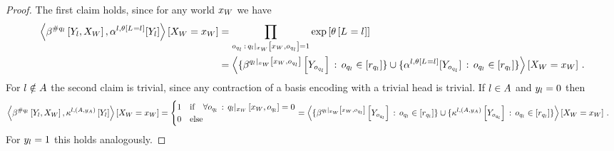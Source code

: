\begin{proof}
    The first claim holds, since for any world $x_{W}$ we have
    \begin{align*}
        \left\langle \beta^{\#q_{l}}\left[Y_{l},X_{W}\right],\alpha^{l,\theta\left[L_{}=l_{}\right]}[Y_{l}]\right\rangle \left[ X_{W}=x_{W} \right]
        &= \prod_{o_{q_{l}}\,:\,{q_{l}}|_{x_{W}} \left[x_{W},o_{q_{l}}\right]=1} \mathrm{exp}\left[\theta\left[L_{}=l_{}\right]\right] \\
        &= \left\langle 
            \{\beta^{{q_{l}}|_{x_{W}} \left[x_{W},o_{q_{l}}\right]}\left[Y_{o_{q_{l}}}\right] \,:\, o_{q_{l}}\in[r_{q_{l}}]\}
            \cup
            \{\alpha^{l,\theta\left[L_{}=l_{}\right]}[Y_{o_{q_{l}}}] \,:\, o_{q_{l}}\in[r_{q_{l}}]\}
        \right\rangle \left[ X_{W}=x_{W} \right] \, .
    \end{align*}
    For $l\notin A$ the second claim is trivial, since any contraction of a basis encoding with a trivial head is trivial.
    If $l\in A$ and $y_{l}=0$ then 
    \begin{align*}
        \left\langle \beta^{\#q_{l}}\left[Y_{l},X_{W}\right],\kappa^{l,(A,y_{A})}\left[Y_{l}\right]\right\rangle \left[ X_{W}=x_{W} \right]
        &=
        \begin{cases}
            1 & \text{if}\quad \forall o_{q_{l}} \,:\,  {q_{l}}|_{x_{W}} \left[x_{W},o_{q_{l}}\right] = 0\\
            0 & \text{else}
        \end{cases}
        = \left\langle 
            \{\beta^{{q_{l}}|_{x_{W}} \left[x_{W},o_{q_{l}}\right]}\left[Y_{o_{q_{l}}}\right] \,:\, o_{q_{l}}\in[r_{q_{l}}]\}
            \cup
            \{\kappa^{l,(A,y_{A})}\left[Y_{o_{q_{l}}}\right] \,:\, o_{q_{l}}\in[r_{q_{l}}]\}
        \right\rangle \left[ X_{W}=x_{W} \right] \, .
    \end{align*}
    For $y_{l}=1$ this holds analogously.
\end{proof}


